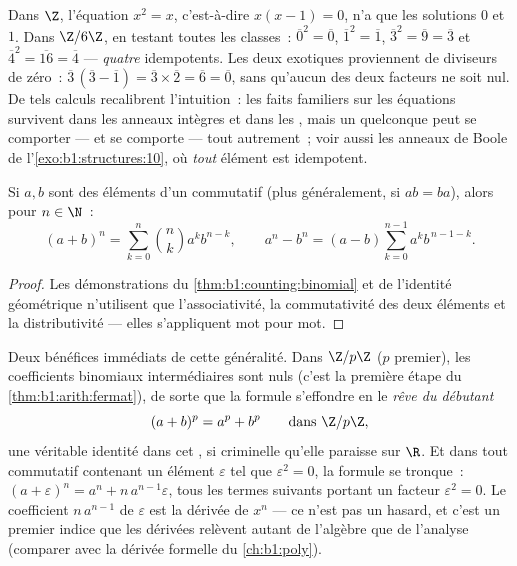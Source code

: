 \begin{example}\label{ex:b1:structures:idempotents}
Dans $\Z$, l'équation $x^2 = x$, c'est-à-dire $x(x - 1) = 0$, n'a que
les solutions $0$ et $1$. Dans $\Z/6\Z$, en testant toutes les
classes~: $\overline0^2 = \overline0$, $\overline1^2 = \overline1$,
$\overline3^2 = \overline9 = \overline3$ et $\overline4^2 =
\overline{16} = \overline4$ --- \emph{quatre} idempotents. Les deux
exotiques proviennent de diviseurs de zéro~: $\overline3\,(\overline3 -
\overline1) = \overline3 \times \overline2 = \overline6 =
\overline0$, sans qu'aucun des deux facteurs ne soit nul. De tels
calculs recalibrent l'intuition~: les faits familiers sur les
équations survivent dans les anneaux intègres et dans les ,
mais un  quelconque peut se comporter --- et se comporte ---
tout autrement~; voir aussi les anneaux de Boole de
l'\cref{exo:b1:structures:10}, où \emph{tout} élément est idempotent.
\end{example}

\begin{proposition}\label{prop:b1:structures:binomial}
Si $a, b$ sont des éléments d'un  commutatif (plus généralement,
si $ab = ba$), alors pour $n \in \N$~:
\[
(a+b)^n = \sum_{k=0}^n \binom nk a^k b^{n-k},
\qquad
a^n - b^n = (a - b) \sum_{k=0}^{n-1} a^k b^{\,n-1-k} .
\]
\end{proposition}

\begin{proof}
Les démonstrations du \cref{thm:b1:counting:binomial} et de l'identité
géométrique n'utilisent que l'associativité, la commutativité des deux
éléments et la distributivité --- elles s'appliquent mot pour mot.
\end{proof}

\begin{example}\label{ex:b1:structures:binomialring}
Deux bénéfices immédiats de cette généralité. Dans $\Z/p\Z$ ($p$
premier), les coefficients binomiaux intermédiaires sont nuls (c'est
la première étape du \cref{thm:b1:arith:fermat}), de sorte que la
formule s'effondre en le \emph{rêve du débutant}
\[
(a + b)^p = a^p + b^p \qquad \text{dans } \Z/p\Z ,
\]
une véritable identité dans cet , si criminelle qu'elle paraisse
sur $\R$.
Et dans tout  commutatif contenant un élément $\varepsilon$
tel que $\varepsilon^2 = 0$, la formule se tronque~:
$(a + \varepsilon)^n = a^n + n\,a^{n-1}\varepsilon$, tous les termes
suivants portant un facteur $\varepsilon^2 = 0$. Le coefficient
$n\,a^{n-1}$ de $\varepsilon$ est la dérivée de $x^n$ --- ce n'est
pas un hasard, et c'est un premier indice que les dérivées relèvent
autant de l'algèbre que de l'analyse (comparer avec la dérivée
formelle du \cref{ch:b1:poly}).
\end{example}

